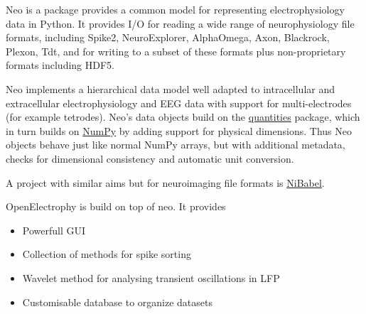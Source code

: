 \begin{multicols}{3}
\vspace{1em}

Neo is a package provides a common model for representing
electrophysiology data in Python. It provides I/O for reading a wide
range of neurophysiology file formats, including Spike2,
NeuroExplorer, AlphaOmega, Axon, Blackrock, Plexon, Tdt, and for
writing to a subset of these formats plus non-proprietary formats
including HDF5.


Neo implements a hierarchical data model well adapted to intracellular
and extracellular electrophysiology and EEG data with support for
multi-electrodes (for example tetrodes).  Neo's data objects build on
the \href{http://pypi.python.org/pypi/quantities}{quantities} package,
which in turn builds on \href{http://www.numpy.org}{NumPy} by adding
support for physical dimensions. Thus Neo objects behave just like
normal NumPy arrays, but with additional metadata, checks for
dimensional consistency and automatic unit conversion.

A project with similar aims but for neuroimaging file formats is
\href{http://www.nipy.org/nibabel}{NiBabel}.




OpenElectrophy is build on top of neo.  It provides

\begin{itemize}[nolistsep,topsep=0em,leftmargin=1pc]
\item Powerfull GUI
\item Collection of methods for spike sorting
\item Wavelet method for analysing transient oscillations in LFP
\item Customisable database to organize datasets
\end{itemize}


\end{multicols}
